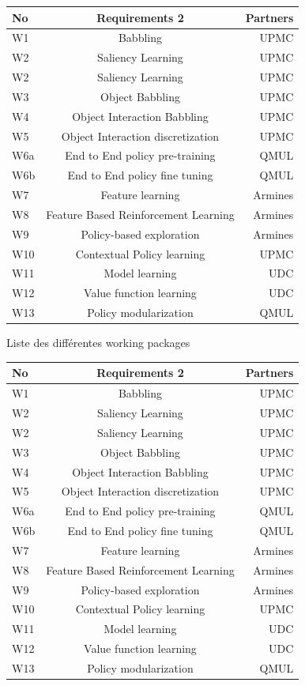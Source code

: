 \documentclass{llncs}
\begin{document}
\begin{tabular}{|l|c|r|}
  \hline
  No & Requirements 2 & Partners \\
  \hline
  W1 & Babbling & UPMC \\
  W2 & Saliency Learning & UPMC \\
  W2 & Saliency Learning & UPMC \\
  W3 & Object Babbling & UPMC \\
  W4 & Object Interaction Babbling & UPMC \\
  W5 & Object Interaction discretization & UPMC \\
  W6a & End to End policy pre-training & QMUL \\
  W6b & End to End policy fine tuning & QMUL \\
  W7 & Feature learning & Armines \\
  W8 & Feature Based Reinforcement Learning & Armines \\
  W9 & Policy-based exploration & Armines \\
  W10 & Contextual Policy learning & UPMC \\
  W11 & Model learning & UDC \\
  W12 & Value function learning & UDC \\
  W13 & Policy modularization & QMUL \\
  \hline
\end{tabular}

Liste des différentes working packages

\begin{tabular}{|l|c|r|}
  \hline
  No & Requirements 2 & Partners \\
  \hline
  W1 & Babbling & UPMC \\
  W2 & Saliency Learning & UPMC \\
  W2 & Saliency Learning & UPMC \\
  W3 & Object Babbling & UPMC \\
  W4 & Object Interaction Babbling & UPMC \\
  W5 & Object Interaction discretization & UPMC \\
  W6a & End to End policy pre-training & QMUL \\
  W6b & End to End policy fine tuning & QMUL \\
  W7 & Feature learning & Armines \\
  W8 & Feature Based Reinforcement Learning & Armines \\
  W9 & Policy-based exploration & Armines \\
  W10 & Contextual Policy learning & UPMC \\
  W11 & Model learning & UDC \\
  W12 & Value function learning & UDC \\
  W13 & Policy modularization & QMUL \\
  \hline
\end{tabular}
\end{document}

